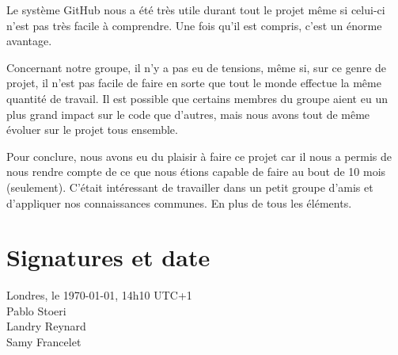 Le système GitHub nous a été très utile durant tout le projet même si celui-ci n’est pas très facile à comprendre. Une fois qu’il est compris, c’est un énorme avantage.

Concernant notre groupe, il n’y a pas eu de tensions, même si, sur ce genre de projet, il n’est pas facile de faire en sorte que tout le monde effectue la même quantité de travail. Il est possible que certains membres du groupe aient eu un plus grand impact sur le code que d’autres, mais nous avons tout de même évoluer sur le projet tous ensemble.

Pour conclure, nous avons eu du plaisir à faire ce projet car il nous a permis de nous rendre compte de ce que nous étions capable de faire au bout de 10 mois (seulement). C’était intéressant de travailler dans un petit groupe d’amis et d’appliquer nos connaissances communes. En plus de tous les éléments.


\section{Signatures et date}

Londres, le \today, 14h10 UTC+1 \\

{\raggedleft
Pablo Stoeri\\[1cm]

Landry Reynard\\[1cm]

Samy Francelet\\[1cm]
}
